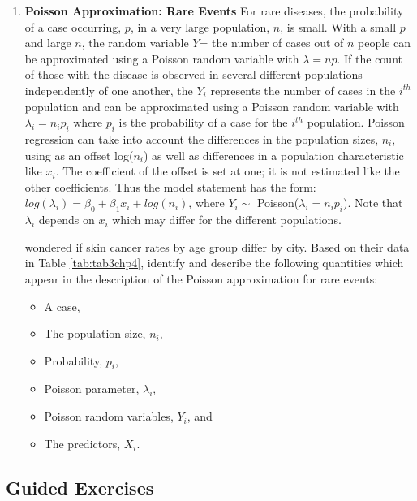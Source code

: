 \documentclass[
]{krantz}
\providecommand{\tightlist}{%
  \setlength{\itemsep}{0pt}\setlength{\parskip}{0pt}}
\begin{document}
\begin{enumerate}
\def\labelenumi{\arabic{enumi}.}
\setcounter{enumi}{15}
\item
  \textbf{Poisson Approximation: Rare Events} For rare diseases, the probability of a case occurring, \(p\), in a very large population, \(n\), is small. With a small \(p\) and large \(n\), the random variable \(Y\)= the number of cases out of \(n\) people can be approximated using a Poisson random variable with \(\lambda = np\). If the count of those with the disease is observed in several different populations independently of one another, the \(Y_i\) represents the number of cases in the \(i^{th}\) population and can be approximated using a Poisson random variable with \(\lambda_i=n_ip_i\) where \(p_i\) is the probability of a case for the \(i^{th}\) population. Poisson regression can take into account the differences in the population sizes, \(n_i\), using as an offset log(\(n_i\)) as well as differences in a population characteristic like \(x_i\). The coefficient of the offset is set at one; it is not estimated like the other coefficients. Thus the model statement has the form: \(log(\lambda_i) = \beta_0+\beta_1x_i + log(n_i)\), where \(Y_i \sim\) Poisson(\(\lambda_i = n_i p_i\)). Note that \(\lambda_i\) depends on \(x_i\) which may differ for the different populations.

  \citet{Scotto1974} wondered if skin cancer rates by age group differ by city. Based on their data in Table \ref{tab:tab3chp4}, identify and describe the following quantities which appear in the description of the Poisson approximation for rare events:

  \begin{itemize}
  \tightlist
  \item
    A case,
  \item
    The population size, \(n_i\),
  \item
    Probability, \(p_i\),
  \item
    Poisson parameter, \(\lambda_i\),
  \item
    Poisson random variables, \(Y_i\), and
  \item
    The predictors, \(X_i\).
  \end{itemize}
\end{enumerate}

\hypertarget{guided-exercises-3}{%
\subsection{Guided Exercises}\label{guided-exercises-3}}
\end{document}
